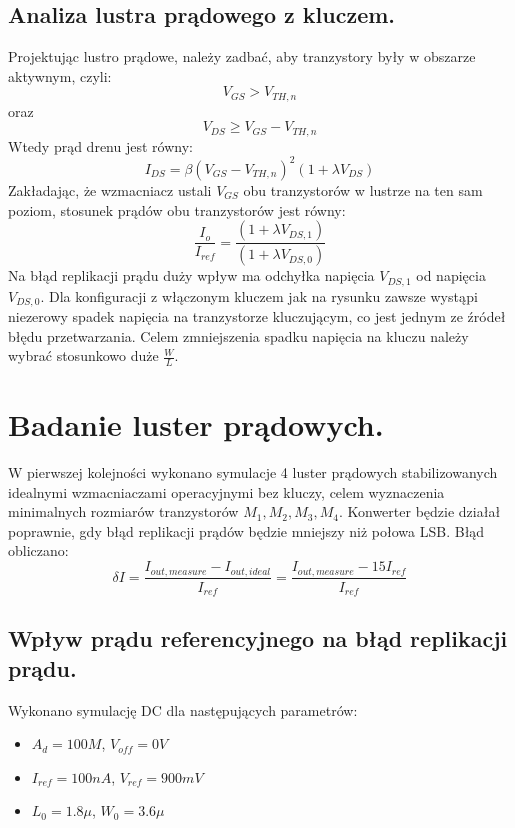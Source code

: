 \documentclass[10pt,a4paper]{report}
\theoremstyle{definition}
\theoremstyle{definition}
\theoremstyle{definition}
\theoremstyle{definition}
\theoremstyle{definition}
\begin{document}
	\subsection{Analiza lustra prądowego z kluczem.}
	{ Projektując lustro prądowe, należy zadbać, aby tranzystory były w obszarze aktywnym, czyli:
	\begin{equation} \label{eq_cutoff}
	V_{GS} > V_{TH,n}
	\end{equation}
	oraz
	\begin{equation} \label{eq_saturation}
	V_{DS} \ge V_{GS} - V_{TH,n}
	\end{equation}
	Wtedy prąd drenu jest równy:
	\begin{equation}
	I_{DS} = \beta \left( V_{GS} - V_{TH,n} \right)^2 \left(1+\lambda V_{DS} \right)
	\end{equation}
	Zakładając, że wzmacniacz ustali $V_{GS}$ obu tranzystorów w lustrze na ten sam poziom, stosunek prądów obu tranzystorów jest równy:
	\begin{equation}
	\frac{I_o}{I_{ref}} = \frac{\left(1+\lambda V_{DS,1} \right)}{\left(1+\lambda V_{DS,0} \right)}
	\end{equation}
	Na błąd replikacji prądu duży wpływ ma odchyłka napięcia $V_{DS,1}$ od napięcia $V_{DS,0}$. Dla konfiguracji z włączonym kluczem jak na rysunku zawsze wystąpi niezerowy spadek napięcia na tranzystorze kluczującym, co jest jednym ze źródeł błędu przetwarzania. Celem zmniejszenia spadku napięcia na kluczu należy wybrać stosunkowo duże $\frac{W}{L}$.
	}

	\section{Badanie luster prądowych.}
	{	W pierwszej kolejności wykonano symulacje 4 luster prądowych stabilizowanych idealnymi wzmacniaczami operacyjnymi bez kluczy, celem wyznaczenia minimalnych rozmiarów tranzystorów  $M_1, M_2, M_3, M_4$. Konwerter będzie działał poprawnie, gdy błąd replikacji prądów będzie mniejszy niż połowa LSB. Błąd obliczano:}
	\begin{equation}
		\delta I = \frac{I_{out,measure} - I_{out,ideal}}{I_{ref}} = \frac{I_{out,measure} - 15 I_{ref}}{I_{ref}}
	\end{equation}
	\subsection{Wpływ prądu referencyjnego na błąd replikacji prądu.}
	{ Wykonano symulację DC dla następujących parametrów:
	\begin{itemize}
		\item $A_d = 100M$, $V_{off} = 0V$
		\item $I_{ref} = 100nA$, $V_{ref} = 900mV$
		\item $L_0 = 1.8\mu$, $W_0 = 3.6\mu$
	\end{itemize} }
	
\end{document}
